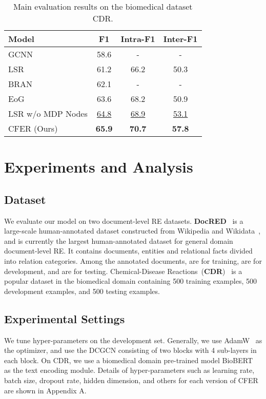 \documentclass{article}
\newcommand{\citep}{\cite}
\begin{document}
\begin{table}[t]
\centering
\setlength{\tabcolsep}{2pt}
\begin{tabular}{l | c c c}
\toprule
\textbf{Model} & \textbf{F1} & \textbf{Intra-F1} & \textbf{Inter-F1} \\
\midrule
GCNN~\citep{gcnn} & 58.6 & - & - \\
LSR~\citep{lsr} & 61.2 & 66.2 & 50.3 \\
BRAN~\citep{barn} & 62.1 & - & - \\
EoG~\citep{eog} & 63.6 & 68.2 & 50.9 \\
LSR w/o MDP Nodes & \underline{64.8} & \underline{68.9} & \underline{53.1} \\
CFER (Ours) & \textbf{65.9} & \textbf{70.7} & \textbf{57.8} \\
\bottomrule
\end{tabular}
\caption{Main evaluation results on the biomedical dataset CDR. }
\label{tab:cdr}
\end{table}

\section{Experiments and Analysis}

\subsection{Dataset}
We evaluate our model on two document-level RE datasets. 
\textbf{DocRED}~\citep{docred} is a large-scale human-annotated dataset constructed from Wikipedia and Wikidata~\citep{wikidata}, and is currently the largest human-annotated dataset for general domain document-level RE. 
It contains  documents,  entities and  relational facts divided into  relation categories. 
Among the annotated documents,  are for training,  are for development, and  are for testing. 
Chemical-Disease Reactions~(\textbf{CDR})~\citep{cdr} is a popular dataset in the biomedical domain containing 500 training examples, 500
development examples, and 500 testing examples. 

\subsection{Experimental Settings}
We tune hyper-parameters on the development set. 
Generally, we use AdamW~\citep{adamw} as the optimizer, and use the DCGCN consisting of two blocks with 4 sub-layers in each block. 
On CDR, we use a biomedical domain pre-trained model BioBERT~\citep{biobert} as the text encoding module. 
Details of hyper-parameters such as learning rate, batch size, dropout rate, hidden dimension, and others for each version of CFER are shown in Appendix A. 
\end{document}
